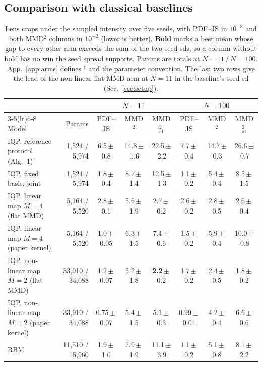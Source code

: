 \documentclass{article}
\begin{document}
\subsection{Comparison with classical baselines}
\label{sec:table}
\begin{table}[t]
\centering
\caption{Lens crops under the sampled intensity over five seeds, with PDF--JS in $10^{-3}$ and both
MMD$^2$ columns in $10^{-2}$ (lower is better). \textbf{Bold} marks a best mean whose gap to every
other arm exceeds the sum of the two seed sds, so a column without bold has no win the seed spread
supports. Params are totals at $N{=}11\,/\,N{=}100$. App.~\ref{app:arms} defines $^{\dagger}$ and
the parameter convention. The last two rows give the lead of the non-linear flat-MMD arm at
$N{=}11$ in the baseline's seed sd (Sec.~\ref{sec:setup}).}
\label{tab:main}
\scriptsize
\setlength{\tabcolsep}{2pt}
\begin{tabular}{lrcccccc}
\toprule
& & \multicolumn{3}{c}{$N = 11$} & \multicolumn{3}{c}{$N = 100$} \\
\cmidrule(lr){3-5}\cmidrule(lr){6-8}
Model & Params & PDF--JS & MMD$^2$ & MMD$^2_{\mathrm{al}}$ & PDF--JS & MMD$^2$ & MMD$^2_{\mathrm{al}}$ \\
\midrule
IQP, reference protocol (Alg.~1)$^{\dagger}$ & 1{,}524 / 5{,}974 & 6.5\,$\pm$\,0.8 & 14.8\,$\pm$\,1.6 & 22.5\,$\pm$\,2.2 & 7.7\,$\pm$\,0.4 & 14.7\,$\pm$\,0.3 & 26.6\,$\pm$\,0.7 \\
IQP, fixed basis, joint           & 1{,}524 / 5{,}974 & 1.8\,$\pm$\,0.4 & 8.7\,$\pm$\,1.4 & 12.5\,$\pm$\,1.3 & 1.1\,$\pm$\,0.2 & 5.4\,$\pm$\,0.4 & 8.5\,$\pm$\,1.5 \\
IQP, linear map $M{=}4$ (flat MMD) & 5{,}164 / 5{,}520 & 2.8\,$\pm$\,0.1 & 5.6\,$\pm$\,1.9 & 2.7\,$\pm$\,0.2 & 2.6\,$\pm$\,0.2 & 2.8\,$\pm$\,0.5 & 2.6\,$\pm$\,0.4 \\
IQP, linear map $M{=}4$ (paper kernel) & 5{,}164 / 5{,}520 & 1.0\,$\pm$\,0.05 & 6.3\,$\pm$\,1.5 & 7.4\,$\pm$\,0.6 & 1.5\,$\pm$\,0.2 & 5.9\,$\pm$\,0.4 & 10.0\,$\pm$\,0.8 \\
IQP, non-linear map $M{=}2$ (flat MMD) & 33{,}910 / 34{,}088 & 1.2\,$\pm$\,0.07 & 5.2\,$\pm$\,1.8 & \textbf{2.2}\,$\pm$\,0.2 & 1.7\,$\pm$\,0.2 & 2.4\,$\pm$\,0.5 & 1.8\,$\pm$\,0.2 \\
IQP, non-linear map $M{=}2$ (paper kernel) & 33{,}910 / 34{,}088 & 0.75\,$\pm$\,0.07 & 5.4\,$\pm$\,1.5 & 5.1\,$\pm$\,0.3 & 0.99\,$\pm$\,0.04 & 4.2\,$\pm$\,0.4 & 6.6\,$\pm$\,0.6 \\
RBM~\cite{tieleman_2008_training}  & 11{,}510 / 15{,}960 & 1.9\,$\pm$\,1.0 & 7.9\,$\pm$\,1.9 & 11.1\,$\pm$\,3.9 & 1.1\,$\pm$\,0.2 & 5.1\,$\pm$\,0.8 & 8.1\,$\pm$\,2.2 \\

\end{tabular}
\end{table}
\end{document}
